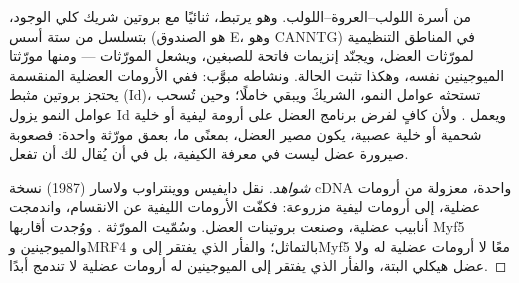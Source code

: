 \begin{proposition}\label{prop:b2:cell-differentiation:myod}
  من أسرة اللولب--العروة--اللولب. وهو
يرتبط، ثنائيًا مع بروتين شريك كلي الوجود، بتسلسل من ستة أسس
(هو الصندوق E، وهو CANNTG) في المناطق التنظيمية لمورّثات
العضل، ويجنّد إنزيمات فاتحة للصبغين، ويشعل المورّثات
--- ومنها مورّثتا الميوجينين  نفسه، وهكذا
تثبت الحالة. ونشاطه مبوَّب: ففي الأرومات العضلية المنقسمة يحتجز
بروتين مثبط (Id)، تستحثه عوامل النمو، الشريكَ
ويبقي  خاملًا؛ وحين تُسحب عوامل النمو يزول Id
ويعمل . ولأن  كافٍ لفرض
برنامج العضل على أرومة ليفية أو خلية شحمية أو خلية عصبية، يكون
مصير العضل، بمعنًى ما، بعمق مورّثة واحدة: فصعوبة
صيرورة عضل ليست في معرفة الكيفية، بل في أن يُقال لك أن تفعل.
\end{proposition}
\begin{proof}[شواهد]
نقل دايفيس ووينتراوب ولاسار (1987) نسخة cDNA واحدة،
معزولة من أرومات عضلية، إلى أرومات ليفية مزروعة: فكفّت الأرومات الليفية
عن الانقسام، واندمجت أنابيب عضلية، وصنعت بروتينات العضل.
وسُمّيت المورّثة . ووُجدت أقاربها Myf5 والميوجينين وMRF4
بالتماثل؛ والفأر الذي يفتقر إلى  وMyf5 معًا لا أرومات
عضلية له ولا عضل هيكلي البتة، والفأر الذي يفتقر إلى
الميوجينين له أرومات عضلية لا تندمج أبدًا.
\end{proof}


